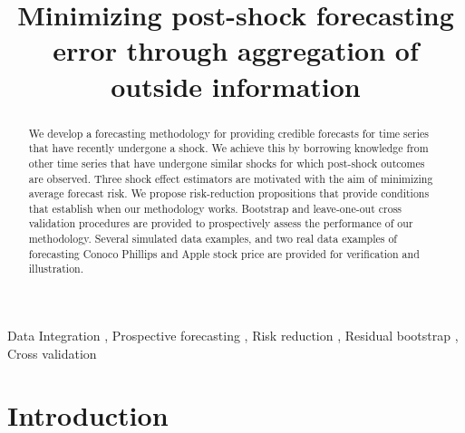 \documentclass[11pt,3p,review,authoryear]{elsarticle}
\theoremstyle{definition}
\begin{document}
\begin{frontmatter}

\title{Minimizing post-shock forecasting error through aggregation of outside information}




\begin{abstract}
    We develop a forecasting methodology for providing credible forecasts for time series that have recently undergone a shock. We achieve this by borrowing knowledge from other time series that have undergone similar shocks for which post-shock outcomes are observed. Three shock effect estimators are motivated with the aim of minimizing average forecast risk. We propose risk-reduction propositions that provide conditions that establish when our methodology works. Bootstrap and leave-one-out cross validation procedures are provided to prospectively assess the performance of our methodology. Several simulated data examples, and two real data examples of forecasting Conoco Phillips and Apple stock price are provided for verification and illustration.
\end{abstract}


\begin{keyword}
  Data Integration \sep 
 Prospective forecasting \sep 
 Risk reduction \sep 
Residual bootstrap \sep 
Cross validation 
\end{keyword}

\end{frontmatter}

\section{Introduction}
\end{document}
